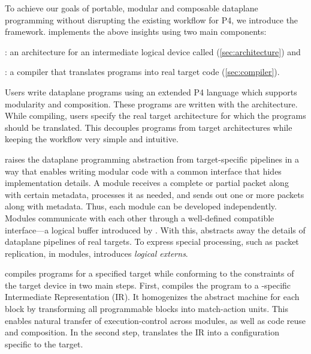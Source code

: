 \documentclass[letterpaper,twocolumn,10pt]{article}
\begin{document}
To achieve our goals of portable, modular and composable dataplane
programming without disrupting the existing workflow for P4, we
introduce the \ulang framework. \ulang implements the above insights
using two main components:
\begin{enumerate*}[label=(\roman*)]
  \item \uarch: an architecture for an intermediate logical device
    called \uswitch (\cref{sec:architecture}) and
  \item \ucomp: a compiler that translates \ulang programs into real
    target code (\cref{sec:compiler}).
\end{enumerate*}

Users write dataplane programs using an extended P4 language which
supports modularity and composition. These programs are written with
the \uarch architecture. While compiling, users specify the real
target architecture for which the \ulang programs should be
translated. This decouples programs from target architectures while
keeping the workflow very simple and intuitive.

\uarch raises the dataplane programming abstraction from
target-specific pipelines in a way that enables writing modular code
with a common interface that hides implementation details. A module
receives a complete or partial packet along with certain metadata,
processes it as needed, and sends out one or more packets along with
metadata. Thus, each module can be developed independently. Modules
communicate with each other through a well-defined compatible
interface---a logical buffer introduced by \uswitch.  With this,
\uswitch abstracts away the details of dataplane pipelines of real
targets. To express special processing, such as packet replication, in
\ulang modules, \uarch introduces \emph{logical externs}.

\ucomp compiles \ulang programs for a specified target while
conforming to the constraints of the target device in two main steps.
First, \ucomp compiles the program to a \uarch-specific Intermediate
Representation (IR). It homogenizes the abstract machine for each
block by transforming all programmable blocks into match-action units.
This enables natural transfer of execution-control across modules, as
well as code reuse and composition. In the second step, \ucomp
translates the IR into a configuration specific to the target.

\end{document}

